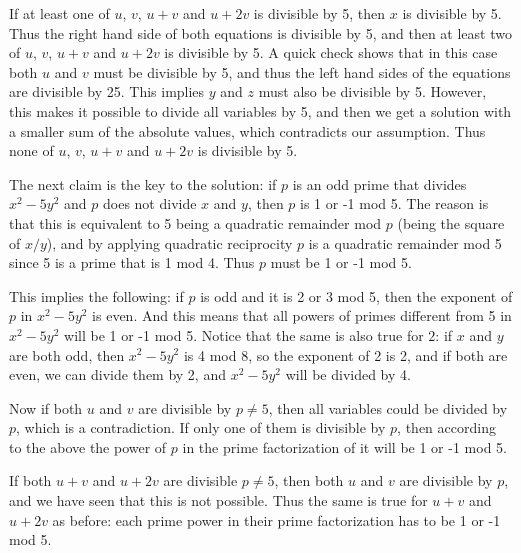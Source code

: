 \documentclass{article}
\begin{document}
If at least one of \(\displaystyle u\), \(\displaystyle v\), \(\displaystyle u+v\) and  \(\displaystyle u+2v\) is divisible by 5, then \(\displaystyle x\) is divisible by 5. Thus the right hand side of both equations is divisible by 5, and then at least two of \(\displaystyle u\), \(\displaystyle v\), \(\displaystyle u+v\) and  \(\displaystyle u+2v\) is divisible by 5. A quick check shows that in this case both \(\displaystyle u\) and \(\displaystyle v\) must be divisible by 5, and thus the left hand sides of the equations are divisible by 25. This implies \(\displaystyle y\) and \(\displaystyle z\) must also be divisible by 5. However, this makes it possible to divide all variables by 5, and then we get a solution with a smaller sum of the absolute values, which contradicts our assumption. Thus none of \(\displaystyle u\), \(\displaystyle v\), \(\displaystyle u+v\) and  \(\displaystyle u+2v\) is divisible by 5.

The next claim is the key to the solution: if \(\displaystyle p\) is an odd prime that divides \(\displaystyle x^2-5y^2\) and \(\displaystyle p\) does not divide \(\displaystyle x\) and \(\displaystyle y\), then \(\displaystyle p\) is 1 or -1 mod 5. The reason is that this is equivalent to 5 being a quadratic remainder mod \(\displaystyle p\) (being the square of \(\displaystyle x/y\)), and by applying quadratic reciprocity \(\displaystyle p\) is a quadratic remainder mod 5 since 5 is a prime that is 1 mod 4. Thus \(\displaystyle p\) must be 1 or -1 mod 5.

This implies the following: if \(\displaystyle p\) is odd and it is 2 or 3 mod 5, then the exponent of \(\displaystyle p\) in \(\displaystyle x^2-5y^2\) is even. And this means that all powers of primes different from 5 in \(\displaystyle x^2-5y^2\) will be 1 or -1 mod 5. Notice that the same is also true for \(\displaystyle 2\): if \(\displaystyle x\) and \(\displaystyle y\) are both odd, then \(\displaystyle x^2-5y^2\) is 4 mod 8, so the exponent of 2 is 2, and if both are even, we can divide them by 2, and \(\displaystyle x^2-5y^2\) will be divided by 4.

Now if both \(\displaystyle u\) and \(\displaystyle v\) are divisible by \(\displaystyle p\neq 5\), then all variables could be divided by \(\displaystyle p\), which is a contradiction. If only one of them is divisible by \(\displaystyle p\), then according to the above the power of \(\displaystyle p\) in the prime factorization of it will be 1 or -1 mod 5.

If both \(\displaystyle u+v\) and \(\displaystyle u+2v\) are divisible \(\displaystyle p\neq 5\), then both \(\displaystyle u\) and \(\displaystyle v\) are divisible by \(\displaystyle p\), and we have seen that this is not possible. Thus the same is true for \(\displaystyle u+v\) and \(\displaystyle u+2v\) as before: each prime power in their prime factorization has to be 1 or -1 mod 5.
\end{document}
